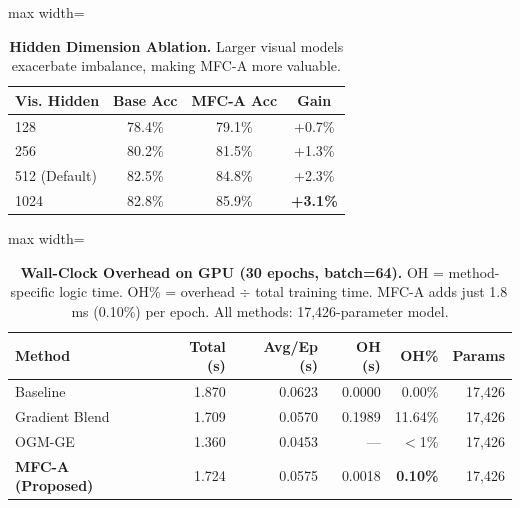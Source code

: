 \documentclass[preprint,a4paper, 10pt, 5p]{elsarticle}
\begin{document}
\begin{table}[h]
\caption{\textbf{Hidden Dimension Ablation.} Larger visual models exacerbate imbalance, making MFC-A more valuable.}
\label{tab:hidden_dim_main}
\centering
\begin{adjustbox}{max width=\linewidth}\begin{tabular}{@{}lccc@{}}
\toprule
\textbf{Vis. Hidden} & \textbf{Base Acc} & \textbf{MFC-A Acc} & \textbf{Gain} \\ \midrule
128 & 78.4\% & 79.1\% & +0.7\% \\
256 & 80.2\% & 81.5\% & +1.3\% \\
512 (Default) & 82.5\% & 84.8\% & +2.3\% \\
1024 & 82.8\% & 85.9\% & \textbf{+3.1\%} \\ \bottomrule
\end{tabular}\end{adjustbox}
\end{table}

\begin{table}[h]
\caption{\textbf{Wall-Clock Overhead on GPU (30 epochs, batch=64).} OH = method-specific logic time. OH\% = overhead $\div$ total training time. MFC-A adds just 1.8\,ms (0.10\%) per epoch. All methods: 17,426-parameter model.}
\label{tab:timing}
\centering
\begin{adjustbox}{max width=\linewidth}\begin{tabular}{@{}lrrrrr@{}}
\toprule
\textbf{Method} & \textbf{Total (s)} & \textbf{Avg/Ep (s)} & \textbf{OH (s)} & \textbf{OH\%} & \textbf{Params} \\ \midrule
Baseline               & 1.870 & 0.0623 & 0.0000 & 0.00\%  & 17,426 \\
Gradient Blend         & 1.709 & 0.0570 & 0.1989 & 11.64\% & 17,426 \\
OGM-GE                 & 1.360 & 0.0453 & ---    & $<$1\%  & 17,426 \\
\textbf{MFC-A (Proposed)} & 1.724 & 0.0575 & 0.0018 & \textbf{0.10\%} & 17,426 \\
\bottomrule
\end{tabular}\end{adjustbox}
\end{table}
\end{document}
